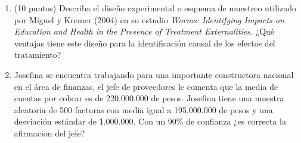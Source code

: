\documentclass[10pt,a4paper]{article}
\begin{document}
\begin{enumerate}

    \item (10 puntos) Describa el diseño experimental o esquema de muestreo utilizado por Miguel y Kremer (2004) en su estudio {\it Worms: Identifying Impacts on Education and Health in the Presence of Treatment Externalities}.
    ¿Qué ventajas tiene este diseño para la identificación causal de los efectos del tratamiento?

\item   Josefina se encuentra trabajando para una importante constructora nacional en el \'area de finanzas, el jefe de
proveedores le comenta que la media de cuentas por cobrar es de 220.000.000 de pesos. Josefina tiene una  muestra aleatoria de 500 facturas con media igual a 195.000.000 de pesos y una desviaci\'on
est\'andar de 1.000.000. Con un 90\% de confianza ¿es correcta la afirmacion del jefe?



\end{enumerate}
\end{document}

